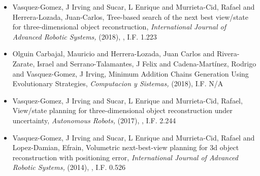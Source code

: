 \begin{itemize}
\item Vasquez-Gomez, J Irving and Sucar, L Enrique and Murrieta-Cid, Rafael and Herrera-Lozada, Juan-Carlos, Tree-based search of the next best view/state for three-dimensional object reconstruction,\textit{ International Journal of Advanced Robotic Systems,} (2018), \href{10.1177/1729881418754575} {\faFilePdfO}, I.F. 1.223 
\item Olguin Carbajal, Mauricio and Herrera-Lozada, Juan Carlos and Rivera-Zarate, Israel and Serrano-Talamantes, J Felix and Cadena-Martínez, Rodrigo and Vasquez-Gomez, J Irving, Minimum Addition Chains Generation Using Evolutionary Strategies,\textit{ Computacion y Sistemas,} (2018), I.F. N/A 
\item Vasquez-Gomez, J Irving and Sucar, L Enrique and Murrieta-Cid, Rafael, View/state planning for three-dimensional object reconstruction under uncertainty,\textit{ Autonomous Robots,} (2017), \href{https://doi.org/10.1007/s10514-015-9531-3} {\faFilePdfO}, I.F. 2.244 
\item Vasquez-Gomez, J Irving and Sucar, L Enrique and Murrieta-Cid, Rafael and Lopez-Damian, Efrain, Volumetric next-best-view planning for 3d object reconstruction with positioning error,\textit{ International Journal of Advanced Robotic Systems,} (2014), \href{https://doi.org/10.5772/58759} {\faFilePdfO}, I.F. 0.526 
\end{itemize} 
